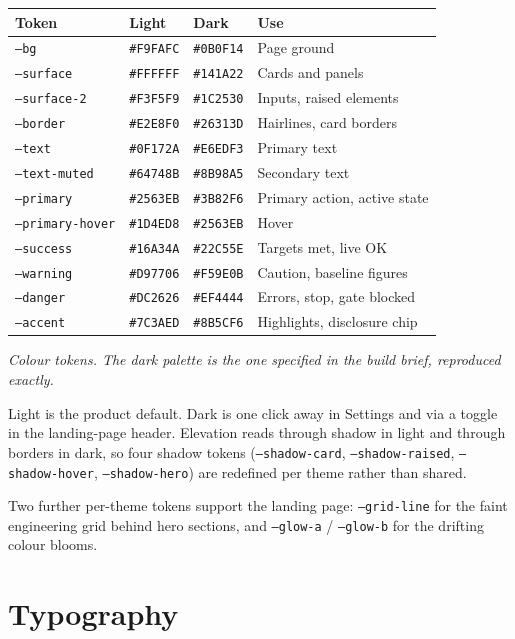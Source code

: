 \documentclass[11pt,a4paper]{report}
\newcommand{\code}[1]{\texttt{\small #1}}
\begin{document}
\begin{longtable}{L{3.2cm} L{2.6cm} L{2.6cm} L{5.6cm}}
\toprule
\textbf{Token} & \textbf{Light} & \textbf{Dark} & \textbf{Use} \\
\midrule
\endhead
\code{--bg} & \code{\#F9FAFC} & \code{\#0B0F14} & Page ground \\
\code{--surface} & \code{\#FFFFFF} & \code{\#141A22} & Cards and panels \\
\code{--surface-2} & \code{\#F3F5F9} & \code{\#1C2530} & Inputs, raised elements \\
\code{--border} & \code{\#E2E8F0} & \code{\#26313D} & Hairlines, card borders \\
\code{--text} & \code{\#0F172A} & \code{\#E6EDF3} & Primary text \\
\code{--text-muted} & \code{\#64748B} & \code{\#8B98A5} & Secondary text \\
\code{--primary} & \code{\#2563EB} & \code{\#3B82F6} & Primary action, active state \\
\code{--primary-hover} & \code{\#1D4ED8} & \code{\#2563EB} & Hover \\
\code{--success} & \code{\#16A34A} & \code{\#22C55E} & Targets met, live OK \\
\code{--warning} & \code{\#D97706} & \code{\#F59E0B} & Caution, baseline figures \\
\code{--danger} & \code{\#DC2626} & \code{\#EF4444} & Errors, stop, gate blocked \\
\code{--accent} & \code{\#7C3AED} & \code{\#8B5CF6} & Highlights, disclosure chip \\
\bottomrule
\end{longtable}
\noindent\textit{\small Colour tokens. The dark palette is the one specified in the build
brief, reproduced exactly.}\par\medskip

Light is the product default. Dark is one click away in Settings and via a
toggle in the landing-page header. Elevation reads through shadow in light and
through borders in dark, so four shadow tokens
(\code{--shadow-card}, \code{--shadow-raised}, \code{--shadow-hover},
\code{--shadow-hero}) are redefined per theme rather than shared.

Two further per-theme tokens support the landing page: \code{--grid-line} for
the faint engineering grid behind hero sections, and \code{--glow-a} /
\code{--glow-b} for the drifting colour blooms.

\section{Typography}
\end{document}

